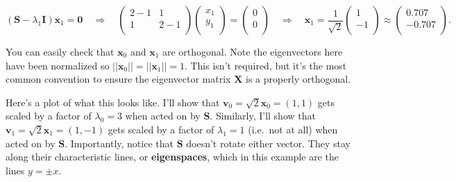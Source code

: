 \documentclass[
  letterpaper,
  DIV=11,
  numbers=noendperiod]{scrreprt}
\begin{document}
\[
(\mathbf{S} - \lambda_1 \mathbf{I})\mathbf{x}_1 = \mathbf{0} \quad \Longrightarrow \quad
\begin{pmatrix}
2-1 & 1 \\
1 & 2-1 \\
\end{pmatrix}
\begin{pmatrix}
x_1 \\
y_1 \\
\end{pmatrix} = 
\begin{pmatrix}
0 \\
0 \\
\end{pmatrix} \quad \Longrightarrow \quad
\mathbf{x}_1 = 
\frac{1}{\sqrt{2}}
\begin{pmatrix}
1 \\
-1 \\
\end{pmatrix} \approx
\begin{pmatrix}
0.707 \\
-0.707 \\
\end{pmatrix}.
\]

You can easily check that \(\mathbf{x}_0\) and \(\mathbf{x}_1\) are
orthogonal. Note the eigenvectors here have been normalized so
\(||\mathbf{x}_0||=||\mathbf{x}_1||=1\). This isn't required, but it's
the most common convention to ensure the eigenvector matrix
\(\mathbf{X}\) is a properly orthogonal.

Here's a plot of what this looks like. I'll show that
\(\mathbf{v}_0=\sqrt{2}\mathbf{x}_0=(1,1)\) gets scaled by a factor of
\(\lambda_0=3\) when acted on by \(\mathbf{S}\). Similarly, I'll show
that \(\mathbf{v}_1=\sqrt{2}\mathbf{x}_1=(1,-1)\) gets scaled by a
factor of \(\lambda_1=1\) (i.e.~not at all) when acted on by
\(\mathbf{S}\). Importantly, notice that \(\mathbf{S}\) doesn't rotate
either vector. They stay along their characteristic lines, or
\textbf{eigenspaces}, which in this example are the lines \(y=\pm x\).
\end{document}
